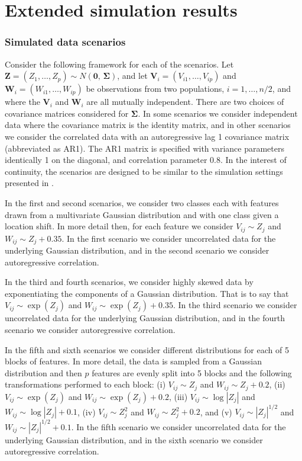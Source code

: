 \documentclass{article}
\renewcommand{\vec}{\bm}
\begin{document}
\section{Extended simulation results}
\label{sec:simulation-results}

\subsubsection{Simulated data scenarios}
\label{sec:simulated-data-scenarios}

Consider the following framework for each of the scenarios.  Let
$\vec{Z} = (Z_1, \dots, Z_p) \sim N(\vec{0},\, \vec{\Sigma})$, and let
$\vec{V}_i = (V_{i1}, \dots, V_{ip})$ and $\vec{W}_i = (W_{i1}, \dots, W_{ip})$
be observations from two populations, $i = 1, \dots, n / 2$, and where the
$\vec{V}_i$ and $\vec{W}_i$ are all mutually independent.  There are two choices
of covariance matrices considered for $\vec{\Sigma}$.  In some scenarios we
consider independent data where the covariance matrix is the identity matrix,
and in other scenarios we consider the correlated data with an autoregressive
lag 1 covariance matrix (abbreviated as AR1).  The AR1 matrix is specified with
variance parameters identically 1 on the diagonal, and correlation parameter
0.8.  In the interest of continuity, the scenarios are designed to be similar to
the simulation settings presented in \cite{hennig2016}.

In the first and second scenarios, we consider two classes each with features
drawn from a multivariate Gaussian distribution and with one class given a
location shift.  In more detail then, for each feature we consider
$V_{ij} \sim Z_j$ and $W_{ij} \sim Z_j + 0.35$.  In the first scenario we
consider uncorrelated data for the underlying Gaussian distribution, and in the
second scenario we consider autoregressive correlation.

In the third and fourth scenarios, we consider highly skewed data by
exponentiating the components of a Gaussian distribution.  That is to say that
$V_{ij} \sim \exp(Z_j)$ and $W_{ij} \sim \exp(Z_j) + 0.35$.  In the third
scenario we consider uncorrelated data for the underlying Gaussian distribution,
and in the fourth scenario we consider autoregressive correlation.

In the fifth and sixth scenarios we consider different distributions for each of
5 blocks of features.  In more detail, the data is sampled from a Gaussian
distribution and then $p$ features are evenly split into 5 blocks and the
following transformations performed to each block: (i) $V_{ij} \sim Z_j$ and
$W_{ij} \sim Z_j + 0.2$, (ii) $V_{ij} \sim \exp(Z_j)$ and
$W_{ij} \sim \exp(Z_j) + 0.2$, (iii) $V_{ij} \sim \log |Z_j|$ and
$W_{ij} \sim \log |Z_j| + 0.1$, (iv) $V_{ij} \sim Z_j^2$ and
$W_{ij} \sim Z_j^2 + 0.2$, and (v) $V_{ij} \sim |Z_j|^{1/2}$ and
$W_{ij} \sim |Z_j|^{1/2} + 0.1$.  In the fifth scenario we consider uncorrelated
data for the underlying Gaussian distribution, and in the sixth scenario we
consider autoregressive correlation.
\end{document}
